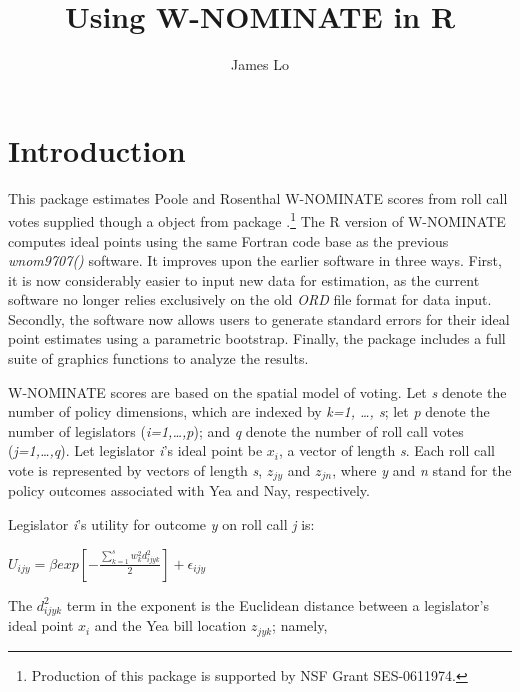 \documentclass[12pt]{article}
\begin{document}
\title{Using W-NOMINATE in R}
\author{James Lo}
\maketitle

\section{Introduction}

This package estimates Poole and Rosenthal W-NOMINATE scores from
roll call votes supplied though a \verb@rollcall@ object from package
\verb@pscl@.\footnote{Production of this package is supported by NSF Grant
SES-0611974.} The R version of W-NOMINATE computes ideal points using the same
Fortran code base as the previous \emph{wnom9707()} software.  It
improves upon the earlier software in three ways.  First, it is
now considerably easier to input new data for estimation, as the
current software no longer relies exclusively on the old
\emph{ORD} file format for data input.  Secondly, the software now
allows users to generate standard errors for their ideal point
estimates using a parametric bootstrap.  Finally, the
\verb@wnominate@ package includes a full suite of graphics
functions to analyze the results.

W-NOMINATE scores are based on the spatial model of voting.  Let
\textit{s} denote the number of policy dimensions, which are
indexed by \textit{k=1, \ldots, s}; let \textit{p} denote the
number of legislators (\textit{i=1,\ldots,p}); and \textit{q}
denote the number of roll call votes (\textit{j=1,\ldots,q}). Let
legislator \textit{i}'s ideal point be \textbf{$x_{i}$}, a vector
of length \textit{s}.  Each roll call vote is represented by
vectors of length \textit{s}, \textbf{$z_{jy}$} and
\textbf{$z_{jn}$}, where \textit{y} and \textit{n} stand for the
policy outcomes associated with Yea and Nay, respectively.

Legislator \textit{i}'s utility for outcome \textit{y} on roll
call \textit{j} is:

\begin{center}
{\Large
\begin{math}
 U_{ijy} = \beta
exp{[-\frac{\sum_{k=1}^{s}w^{2}_{k}d^{2}_{ijyk}}{2}]}
+\epsilon_{ijy}
\end{math}
}\\
\end{center}

The $d^{2}_{ijyk}$ term in the exponent is the Euclidean distance
between a legislator's ideal point $x_{i}$ and the Yea bill
location $z_{jyk}$; namely,
\end{document}
